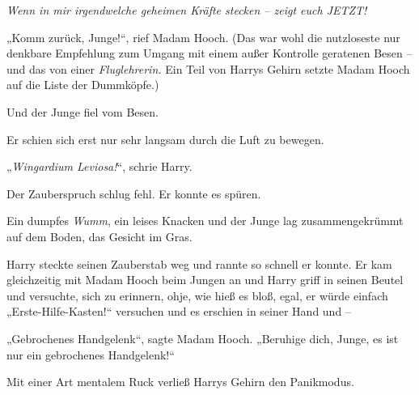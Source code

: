 \emph{Wenn in mir irgendwelche geheimen Kräfte stecken – zeigt euch JETZT!}

„Komm zurück, Junge!“, rief Madam Hooch. (Das war wohl die nutzloseste nur denkbare Empfehlung zum Umgang mit einem außer Kontrolle geratenen Besen – und das von einer \emph{Fluglehrerin.} Ein Teil von Harrys Gehirn setzte Madam Hooch auf die Liste der Dummköpfe.)

Und der Junge fiel vom Besen.

Er schien sich erst nur sehr langsam durch die Luft zu bewegen.

„\emph{Wingardium Leviosa!}“, schrie Harry.

Der Zauberspruch schlug fehl. Er konnte es spüren.

Ein dumpfes \emph{Wumm}, ein leises Knacken und der Junge lag zusammengekrümmt auf dem Boden, das Gesicht im Gras.

Harry steckte seinen Zauberstab weg und rannte so schnell er konnte. Er kam gleichzeitig mit Madam Hooch beim Jungen an und Harry griff in seinen Beutel und versuchte, sich zu erinnern, ohje, wie hieß es bloß, egal, er würde einfach „Erste-Hilfe-Kasten!“ versuchen und es erschien in seiner Hand und –

„Gebrochenes Handgelenk“, sagte Madam Hooch. „Beruhige dich, Junge, es ist nur ein gebrochenes Handgelenk!“

Mit einer Art mentalem Ruck verließ Harrys Gehirn den Panikmodus.

